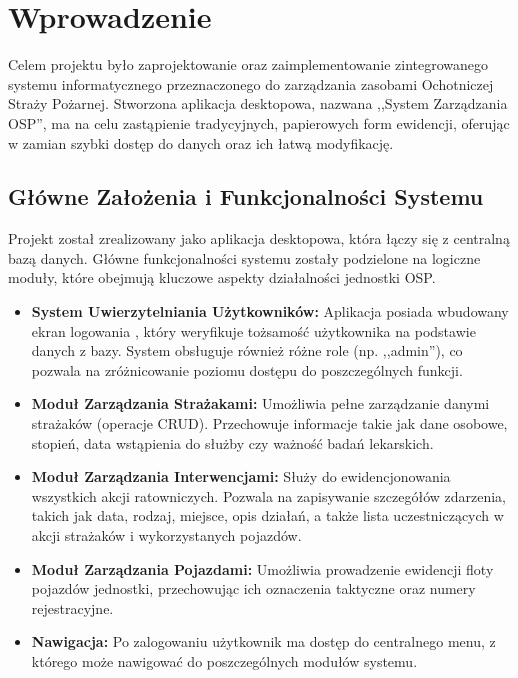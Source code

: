 \chapter{Wprowadzenie}
\label{chap:wprowadzenie}

Celem projektu było zaprojektowanie oraz zaimplementowanie zintegrowanego systemu informatycznego przeznaczonego do zarządzania zasobami Ochotniczej Straży Pożarnej. Stworzona aplikacja desktopowa, nazwana ,,System Zarządzania OSP'', ma na celu zastąpienie tradycyjnych, papierowych form ewidencji, oferując w zamian szybki dostęp do danych oraz ich łatwą modyfikację.

\section{Główne Założenia i Funkcjonalności Systemu}
\label{sec:zalozenia}

Projekt został zrealizowany jako aplikacja desktopowa, która łączy się z centralną bazą danych. Główne funkcjonalności systemu zostały podzielone na logiczne moduły, które obejmują kluczowe aspekty działalności jednostki OSP.

\begin{itemize}
    \item \textbf{System Uwierzytelniania Użytkowników:} Aplikacja posiada wbudowany ekran logowania , który weryfikuje tożsamość użytkownika na podstawie danych z bazy. System obsługuje również różne role (np. ,,admin''), co pozwala na zróżnicowanie poziomu dostępu do poszczególnych funkcji.
    \item \textbf{Moduł Zarządzania Strażakami:} Umożliwia pełne zarządzanie danymi strażaków (operacje CRUD). Przechowuje informacje takie jak dane osobowe, stopień, data wstąpienia do służby czy ważność badań lekarskich.
    \item \textbf{Moduł Zarządzania Interwencjami:} Służy do ewidencjonowania wszystkich akcji ratowniczych. Pozwala na zapisywanie szczegółów zdarzenia, takich jak data, rodzaj, miejsce, opis działań, a także lista uczestniczących w akcji strażaków i wykorzystanych pojazdów.
    \item \textbf{Moduł Zarządzania Pojazdami:} Umożliwia prowadzenie ewidencji floty pojazdów jednostki, przechowując ich oznaczenia taktyczne oraz numery rejestracyjne.
    \item \textbf{Nawigacja:} Po zalogowaniu użytkownik ma dostęp do centralnego menu, z którego może nawigować do poszczególnych modułów systemu.
\end{itemize}

